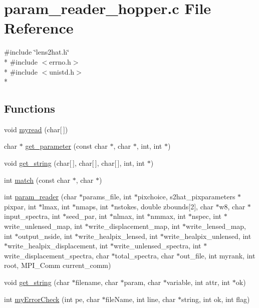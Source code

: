\section{param\-\_\-reader\-\_\-hopper.\-c File Reference}
\label{old_2param__reader__20121302_2param__reader__hopper_8c}
{\ttfamily \#include \char`\"{}lens2hat.\-h\char`\"{}}\\*
{\ttfamily \#include $<$errno.\-h$>$}\\*
{\ttfamily \#include $<$unistd.\-h$>$}\\*
\subsection*{Functions}
\begin{DoxyCompactItemize}
\item 
void \hyperlink{old_2param__reader__20121302_2param__reader__hopper_8c_a50c0568f618886d78986c4a9d6a23ba4}{myread} (char\mbox{[}$\,$\mbox{]})
\item 
char $\ast$ \hyperlink{old_2param__reader__20121302_2param__reader__hopper_8c_ab3cc75c29a38da58b8a99b6f65096891}{get\-\_\-parameter} (const char $\ast$, char $\ast$, int, int $\ast$)
\item 
void \hyperlink{old_2param__reader__20121302_2param__reader__hopper_8c_acdf8e6c6f50db79679922d3dbf74dd84}{get\-\_\-string} (char\mbox{[}$\,$\mbox{]}, char\mbox{[}$\,$\mbox{]}, char\mbox{[}$\,$\mbox{]}, int, int $\ast$)
\item 
int \hyperlink{old_2param__reader__20121302_2param__reader__hopper_8c_af71971b64e93dd85136d531400035e57}{match} (const char $\ast$, char $\ast$)
\item 
int \hyperlink{old_2param__reader__20121302_2param__reader__hopper_8c_ab6bacb8b57a4a9612bd4d7a8ec68dfb9}{param\-\_\-reader} (char $\ast$params\-\_\-file, int $\ast$pixchoice, s2hat\-\_\-pixparameters $\ast$pixpar, int $\ast$lmax, int $\ast$nmaps, int $\ast$nstokes, double zbounds\mbox{[}2\mbox{]}, char $\ast$w8, char $\ast$input\-\_\-spectra, int $\ast$seed\-\_\-par, int $\ast$nlmax, int $\ast$nmmax, int $\ast$nspec, int $\ast$write\-\_\-unlensed\-\_\-map, int $\ast$write\-\_\-displacement\-\_\-map, int $\ast$write\-\_\-lensed\-\_\-map, int $\ast$output\-\_\-nside, int $\ast$write\-\_\-healpix\-\_\-lensed, int $\ast$write\-\_\-healpix\-\_\-unlensed, int $\ast$write\-\_\-healpix\-\_\-displacement, int $\ast$write\-\_\-unlensed\-\_\-spectra, int $\ast$write\-\_\-displacement\-\_\-spectra, char $\ast$total\-\_\-spectra, char $\ast$out\-\_\-file, int myrank, int root, M\-P\-I\-\_\-\-Comm current\-\_\-comm)
\item 
void \hyperlink{old_2param__reader__20121302_2param__reader__hopper_8c_a1be51b19c79f5c49c6ce2128259fc093}{get\-\_\-string} (char $\ast$filename, char $\ast$param, char $\ast$variable, int attr, int $\ast$ok)
\item 
int \hyperlink{old_2param__reader__20121302_2param__reader__hopper_8c_a70bcbd531a6e4abc62d73f5b4532c2cc}{my\-Error\-Check} (int pe, char $\ast$file\-Name, int line, char $\ast$string, int ok, int flag)
\end{DoxyCompactItemize}


